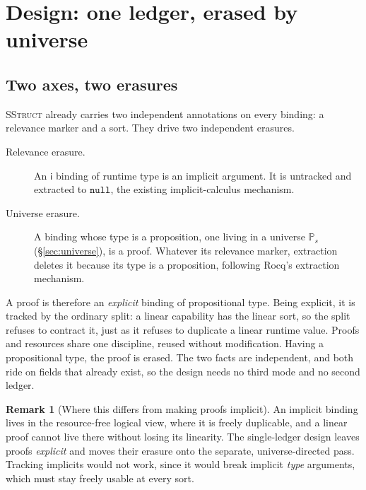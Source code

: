 \documentclass[11pt]{article}
\newcommand{\Prop}[1]{\mathbb{P}_{#1}}            %
\newcommand{\im}{\mathsf{i}}                      %
\newcommand{\nul}{\mathtt{null}}
\theoremstyle{definition}
\newtheorem{remark}[definition]{Remark}
\theoremstyle{plain}
\begin{document}
\section{Design: one ledger, erased by universe}\label{sec:principles}

\subsection{Two axes, two erasures}

\textsc{SStruct} already carries two independent annotations on every binding: a
relevance marker and a sort. They drive two independent erasures.
\begin{description}
\item[Relevance erasure.] An $\im$ binding of runtime type is an implicit
argument. It is untracked and extracted to $\nul$, the existing implicit-calculus
mechanism.
\item[Universe erasure.] A binding whose type is a proposition, one living in a
universe $\Prop{s}$ (\S\ref{sec:universe}), is a proof. Whatever its relevance
marker, extraction deletes it because its type is a proposition, following Rocq's
extraction mechanism.
\end{description}
A proof is therefore an \emph{explicit} binding of propositional type. Being
explicit, it is tracked by the ordinary split: a linear capability has the linear
sort, so the split refuses to contract it, just as it refuses to duplicate a
linear runtime value. Proofs and resources share one discipline, reused without
modification. Having a propositional type, the proof is erased. The two facts are
independent, and both ride on fields that already exist, so the design needs no
third mode and no second ledger.

\begin{remark}[Where this differs from making proofs implicit]
An implicit binding lives in the resource-free logical view, where it is freely
duplicable, and a linear proof cannot live there without losing its linearity. The
single-ledger design leaves proofs \emph{explicit} and moves their erasure onto
the separate, universe-directed pass. Tracking implicits would not work, since it
would break implicit \emph{type} arguments, which must stay freely usable at every
sort.
\end{remark}
\end{document}
